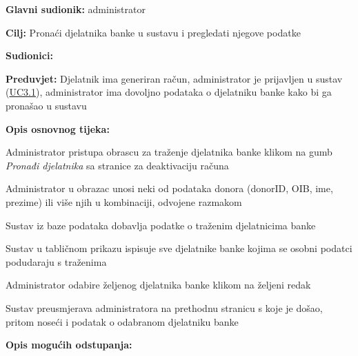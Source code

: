 					
					\noindent {}
					\begin{packed_item}  \label{UC4.2}
	
						\item \textbf{Glavni sudionik: }administrator
						\item  \textbf{Cilj:} Pronaći djelatnika banke u sustavu i pregledati njegove podatke
						\item  \textbf{Sudionici:} 
						\item  \textbf{Preduvjet:} Djelatnik ima generiran račun, administrator je prijavljen u sustav (\hyperref[UC3.1]{UC3.1}), administrator ima dovoljno podataka o djelatniku banke kako bi ga pronašao u sustavu
						\item  \textbf{Opis osnovnog tijeka:}
						
						\item[] \begin{packed_enum}
	                        \item Administrator pristupa obrascu za traženje djelatnika banke klikom na gumb \textit{Pronađi djelatnika} sa stranice za deaktivaciju računa
	                        \item Administrator u obrazac unosi neki od podataka donora (donorID, OIB, ime, prezime) ili više njih u kombinaciji, odvojene razmakom
	                        \item Sustav iz baze podataka dobavlja podatke o traženim djelatnicima banke
	                        \item Sustav u tabličnom prikazu ispisuje sve djelatnike banke kojima se osobni podatci podudaraju s traženima
	                        \item Administrator odabire željenog djelatnika banke klikom na željeni redak
	                        \item Sustav preusmjerava administratora na prethodnu stranicu s koje je došao, pritom noseći i podatak o odabranom djelatniku banke
						\end{packed_enum}
						
						\item  \textbf{Opis mogućih odstupanja:}
						\item[] \begin{packed_item}
	

\end{packed_item}
\end{packed_item}
